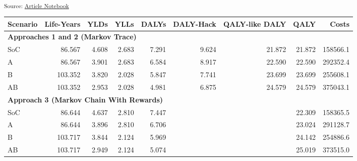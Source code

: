 \documentclass[
]{agujournal2019}
\begin{document}
\begin{table}

\caption{\label{tbl-trace2}Markov Trace Under Approach 2}


\end{table}%

\textsubscript{Source:
\href{https://graveja0.github.io/dalys/index.qmd.html}{Article
Notebook}}

\begin{table}
\centering
\begin{tabular}{l|r|r|r|r|r|r|r|r}
\hline
Scenario & Life-Years & YLDs & YLLs & DALYs & DALY-Hack & QALY-like DALY & QALY & Costs\\
\hline
\multicolumn{9}{l}{\textbf{Approaches 1 and 2 (Markov Trace)}}\\
\hline
\hspace{1em}SoC & 86.567 & 4.608 & 2.683 & 7.291 & 9.624 & 21.872 & 21.872 & 158566.1\\
\hline
\hspace{1em}A & 86.567 & 3.901 & 2.683 & 6.584 & 8.917 & 22.590 & 22.590 & 292352.4\\
\hline
\hspace{1em}B & 103.352 & 3.820 & 2.028 & 5.847 & 7.741 & 23.699 & 23.699 & 255608.1\\
\hline
\hspace{1em}AB & 103.352 & 2.953 & 2.028 & 4.981 & 6.875 & 24.579 & 24.579 & 375043.1\\
\hline
\multicolumn{9}{l}{\textbf{Approach 3 (Markov Chain With Rewards)}}\\
\hline
\hspace{1em}SoC & 86.644 & 4.637 & 2.810 & 7.447 &  &  & 22.309 & 158365.5\\
\hline
\hspace{1em}A & 86.644 & 3.896 & 2.810 & 6.706 &  &  & 23.024 & 291128.7\\
\hline
\hspace{1em}B & 103.717 & 3.844 & 2.124 & 5.969 &  &  & 24.142 & 254886.6\\
\hline
\hspace{1em}AB & 103.717 & 2.949 & 2.124 & 5.074 &  &  & 25.019 & 373515.0\\
\hline
\end{tabular}
\end{table}
\end{document}

